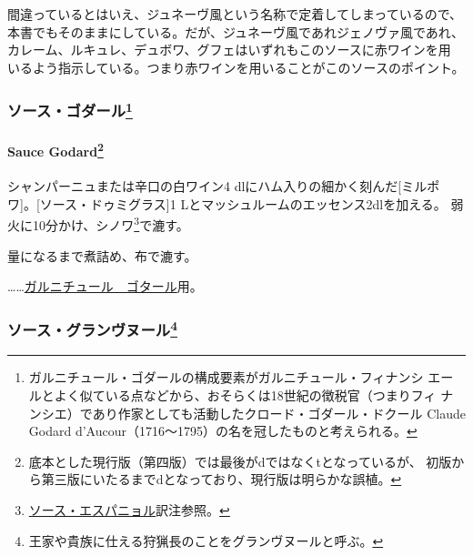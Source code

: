 \begin{recette}
間違っているとはいえ、ジュネーヴ風という名称で定着してしまっているので、
本書でもそのままにしている。だが、ジュネーヴ風であれジェノヴァ風であれ、
カレーム、ルキュレ、デュボワ、グフェはいずれもこのソースに赤ワインを用
いるよう指示している。つまり赤ワインを用いることがこのソースのポイント。

\maeaki

\hypertarget{ux30bdux30fcux30b9ux30b4ux30c0ux30fcux30eb37}{%
\subsubsection[ソース・ゴダール]{\texorpdfstring{ソース・ゴダール\footnote{ガルニチュール・ゴダールの構成要素がガルニチュール・フィナンシ
  エールとよく似ている点などから、おそらくは18世紀の徴税官（つまりフィ
  ナンシエ）であり作家としても活動したクロード・ゴダール・ドクール
  Claude Godard d'Aucour（1716〜1795）の名を冠したものと考えられる。}}{ソース・ゴダール}}\label{ux30bdux30fcux30b9ux30b4ux30c0ux30fcux30eb37}}

\hypertarget{sauce-godard}{%
\paragraph[Sauce Godard]{\texorpdfstring{Sauce Godard\footnote{底本とした現行版（第四版）では最後がdではなくtとなっているが、
  初版から第三版にいたるまでdとなっており、現行版は明らかな誤植。}}{Sauce Godard}}\label{sauce-godard}}


シャンパーニュまたは辛口の白ワイン4 dlにハム入りの細かく刻んだ{[}ミルポ
ワ{]}。{[}ソース・ドゥミグラス{]}1
Lとマッシュルームのエッセンス2dlを加える。
弱火に10分かけ、シノワ\footnote{\protect\hyperlink{sauce-espagnole}{ソース・エスパニョル}訳注参照。}で漉す。

\deuxtiers{}量になるまで煮詰め、布で漉す。

\ldots{}\ldots{}\protect\hyperlink{}{ガルニチュール　ゴタール}用。

\maeaki

\hypertarget{ux30bdux30fcux30b9ux30b0ux30e9ux30f3ux30f4ux30ccux30fcux30eb40}{%
\subsubsection[ソース・グランヴヌール]{\texorpdfstring{ソース・グランヴヌール\footnote{王家や貴族に仕える狩猟長のことをグランヴヌールと呼ぶ。}}{ソース・グランヴヌール}}\label{ux30bdux30fcux30b9ux30b0ux30e9ux30f3ux30f4ux30ccux30fcux30eb40}}


\end{recette}
